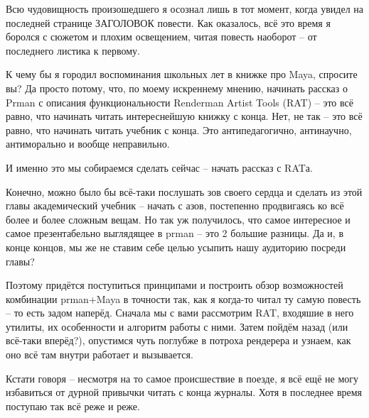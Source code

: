 Всю чудовищность произошедшего я осознал лишь в тот
   момент, когда увидел на последней странице ЗАГОЛОВОК повести. Как
   оказалось, всё это время я боролся с сюжетом и плохим освещением,
   читая повесть наоборот – от последнего листика к
   первому.
 

К чему бы я городил воспоминания школьных лет в
   книжке про Maya, спросите вы? Да просто потому, что, по моему
   искреннему мнению, начинать рассказ о Prman с описания
   функциональности Renderman Artist Tools (RAT) – это всё равно, что
   начинать читать интереснейшую книжку с конца. Нет, не так – это всё
   равно, что начинать читать учебник с конца. Это антипедагогично,
   антинаучно, антиморально и вообще неправильно.
 

И именно это мы собираемся сделать сейчас – начать рассказ с RATа.
 

Конечно, можно было бы всё-таки послушать зов
   своего сердца и сделать из этой главы академический учебник –
   начать с азов, постепенно продвигаясь ко всё более и более сложным
   вещам. Но так уж получилось, что самое интересное и самое
   презентабельно выглядящее в prman – это 2 большие разницы. Да и, в
   конце концов, мы же не ставим себе целью усыпить нашу аудиторию
   посреди главы?
 

Поэтому придётся поступиться принципами и построить
   обзор возможностей комбинации prman+Maya в точности так, как я
   когда-то читал ту самую повесть – то есть задом наперёд. Сначала мы
   с вами рассмотрим RAT, входяшие в него утилиты, их особенности и
   алгоритм работы с ними. Затем пойдём назад (или всё-таки вперёд?),
   опустимся чуть поглубже в потроха рендерера и узнаем, как оно всё
   там внутри работает и вызывается.
 

Кстати говоря – несмотря на то самое происшествие в
   поезде, я всё ещё не могу избавиться от дурной привычки читать с
   конца журналы. Хотя в последнее время поступаю так всё реже и
   реже.